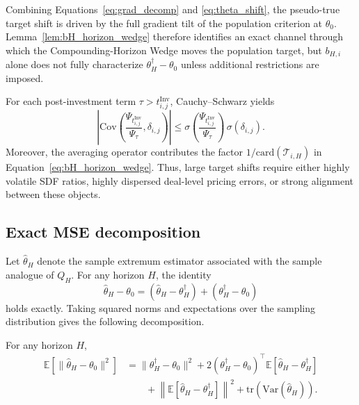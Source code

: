 Combining Equations~\eqref{eq:grad_decomp} and \eqref{eq:theta_shift}, the pseudo-true target shift is driven by the full gradient tilt of the population criterion at $\theta_0$.
Lemma~\ref{lem:bH_horizon_wedge} therefore identifies an exact channel through which the Compounding-Horizon Wedge moves the population target, but $b_{H,i}$ alone does not fully characterize $\theta_H^\dagger-\theta_0$ unless additional restrictions are imposed.

\begin{remark}
	\label{rem:target_shift_magnitude}
	For each post-investment term $\tau>t_{i,j}^{\mathrm{Inv}}$, Cauchy--Schwarz yields
	\[
	\left|
	\mathrm{Cov}\!\left(
	\frac{\Psi_{t_{i,j}^{\mathrm{Inv}}}}{\Psi_\tau},
	\delta_{i,j}
	\right)
	\right|
	\le
	\sigma\!\left(
	\frac{\Psi_{t_{i,j}^{\mathrm{Inv}}}}{\Psi_\tau}
	\right)\,
	\sigma(\delta_{i,j}).
	\]
	Moreover, the averaging operator contributes the factor
	$1/\mathrm{card}(\mathcal{T}_{i,H})$ in Equation~\eqref{eq:bH_horizon_wedge}.
	Thus, large target shifts require either highly volatile SDF ratios, highly dispersed deal-level pricing errors, or strong alignment between these objects.
\end{remark}

\subsection{Exact MSE decomposition}
\label{sec:appendix_bv_mse}

Let $\hat{\theta}_H$ denote the sample extremum estimator associated with the sample analogue of $Q_H$.
For any horizon $H$, the identity
\begin{equation}
	\label{eq:exact_decomp_start}
	\hat{\theta}_H-\theta_0
	=
	(\hat{\theta}_H-\theta_H^\dagger)
	+
	(\theta_H^\dagger-\theta_0)
\end{equation}
holds exactly.
Taking squared norms and expectations over the sampling distribution gives the following decomposition.

\begin{proposition}
	\label{prop:exact_mse}
	For any horizon $H$,
	\begin{align}
		\label{eq:exact_mse}
		\mathbb{E}\!\left[
		\|\hat{\theta}_H-\theta_0\|^2
		\right]
		&=
		\|\theta_H^\dagger-\theta_0\|^2
		+
		2(\theta_H^\dagger-\theta_0)^\top
		\mathbb{E}\!\left[
		\hat{\theta}_H-\theta_H^\dagger
		\right]
		\nonumber\\
		&\qquad
		+
		\left\|
		\mathbb{E}\!\left[
		\hat{\theta}_H-\theta_H^\dagger
		\right]
		\right\|^2
		+
		\mathrm{tr}\!\left(
		\mathrm{Var}(\hat{\theta}_H)
		\right).
	\end{align}
\end{proposition}

